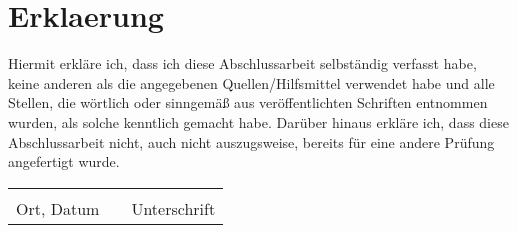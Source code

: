 \section*{Erklaerung}

Hiermit erkläre ich, dass ich diese Abschlussarbeit selbständig verfasst
habe, keine anderen als die angegebenen Quellen/Hilfsmittel verwendet
habe und alle Stellen, die wörtlich oder sinngemäß aus veröffentlichten
Schriften entnommen wurden, als solche kenntlich gemacht habe. Darüber
hinaus erkläre ich, dass diese Abschlussarbeit nicht, auch nicht auszugsweise,
bereits für eine andere Prüfung angefertigt wurde.\\
\begin{tabular}{lp{3em}l}
\vspace{1cm}
 \hspace{6cm}   && \hspace{6cm} \\\cline{1-1}\cline{3-3}
 Ort, Datum     && Unterschrift
\end{tabular}


\blankpage





%
%
